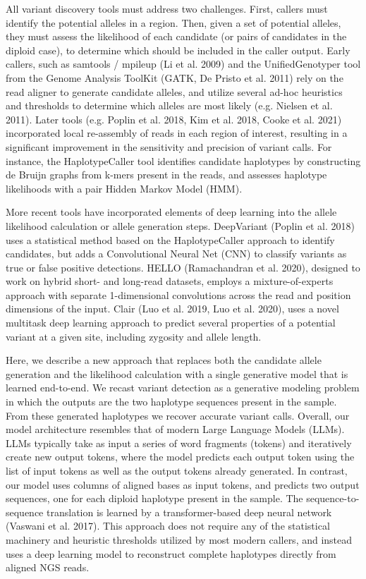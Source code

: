 \documentclass[]{article}
\begin{document}
All variant discovery tools must address two challenges. First, callers must identify the potential alleles in a region. Then, given a set of potential alleles, they must assess the likelihood of each candidate (or pairs of candidates in the diploid case), to determine which should be included in the caller output. Early callers, such as samtools / mpileup (Li et al. 2009) and the UnifiedGenotyper tool from the Genome Analysis ToolKit (GATK, De Pristo et al. 2011) rely on the read aligner to generate candidate alleles, and utilize several ad-hoc heuristics and thresholds to determine which alleles are most likely (e.g. Nielsen et al. 2011). Later tools (e.g. Poplin et al. 2018, Kim et al. 2018, Cooke et al. 2021) incorporated local re-assembly of reads in each region of interest, resulting in a significant improvement in the sensitivity and precision of variant calls. For instance, the HaplotypeCaller tool identifies candidate haplotypes by constructing de Bruijn graphs from k-mers present in the reads, and assesses haplotype likelihoods with a pair Hidden Markov Model (HMM). 

More recent tools have incorporated elements of deep learning into the allele likelihood calculation or allele generation steps. DeepVariant (Poplin et al. 2018) uses a statistical method based on the HaplotypeCaller approach to identify candidates, but adds a Convolutional Neural Net (CNN) to classify variants as true or false positive detections. HELLO (Ramachandran et al. 2020), designed to work on hybrid short- and long-read datasets, employs a mixture-of-experts approach with separate 1-dimensional convolutions across the read and position dimensions of the input. Clair (Luo et al. 2019, Luo et al. 2020), uses a novel multitask deep learning approach to predict several properties of a potential variant at a given site, including zygosity and allele length. 


Here, we describe a new approach that replaces both the candidate allele generation and the likelihood calculation with a single generative model that is learned end-to-end. We recast variant detection as a generative modeling problem in which the outputs are the two haplotype sequences present in the sample. From these generated haplotypes we recover accurate variant calls. Overall, our model architecture resembles that of modern Large Language Models (LLMs). LLMs typically take as input a series of word fragments (tokens) and iteratively create new output tokens, where the model predicts each output token using the list of input tokens as well as the output tokens already generated. In contrast, our model uses columns of aligned bases as input tokens, and predicts two output sequences, one for each diploid haplotype present in the sample. The sequence-to-sequence translation is learned by a transformer-based deep neural network (Vaswani et al. 2017). This approach does not require any of the statistical machinery and heuristic thresholds utilized by most modern callers, and instead uses a deep learning model to reconstruct complete haplotypes directly from aligned NGS reads. 
\end{document}
